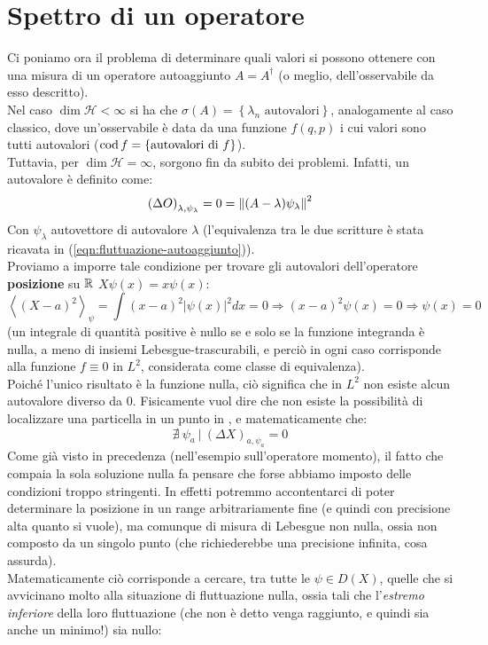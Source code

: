 \documentclass[../../FisicaTeorica.tex]{subfiles}
\begin{document}
\section{Spettro di un operatore}
Ci poniamo ora il problema di determinare quali valori si possono ottenere con una misura di un operatore autoaggiunto $A=A^\dag$ (o meglio, dell'osservabile da esso descritto).\\
Nel caso $\dim{\mathcal{H}}<\infty$ si ha che $\sigma \left(A\right)= \left\{\lambda_n\text{ autovalori}\right\}$, analogamente al caso classico, dove un'osservabile è data da una funzione $f(q,p)$ i cui valori sono tutti autovalori ($\operatorname{cod} f = \{\text{autovalori di }f\}$).\\
Tuttavia, per $\dim{\mathcal{H}}=\infty$, sorgono fin da subito dei problemi.  Infatti, un autovalore è definito come:
\[
\left(\Delta O\right)_{\lambda,\psi_\lambda}=0 = \left\lVert(A-\lambda)\psi_\lambda\right\rVert^2
\]
Con $\psi_\lambda$ autovettore di autovalore $\lambda$ 
(l'equivalenza tra le due scritture è stata ricavata in (\ref{eqn:fluttuazione-autoaggiunto})).\\
Proviamo a imporre tale condizione per trovare gli autovalori dell'operatore \textbf{posizione} su $\mathbb{R}$ $X\psi \left(x\right)=x\psi (x)$:
\[
\left\langle\left(X-a\right)^2\right\rangle_\psi=\int \left(x-a\right)^2\left|\psi\left(x\right)\right|^2dx=0\Rightarrow \left(x-a\right)^2\psi \left(x\right)=0\Rightarrow  \psi \left(x\right)=0 
\]
(un integrale di quantità positive è nullo se e solo se la funzione integranda è nulla, a meno di insiemi Lebesgue-trascurabili, e perciò in ogni caso corrisponde alla funzione $f\equiv 0$ in $L^2$, considerata come classe di equivalenza).\\
Poiché l'unico risultato è la funzione nulla, ciò significa che in $L^2$ non esiste alcun autovalore diverso da $0$. Fisicamente vuol dire che non esiste la possibilità di localizzare una particella in un punto in \MQ, e matematicamente che:
\[
\nexists\> \psi_a\>|\> \left(\Delta X\right)_{a,\psi_a}=0
\]
Come già visto in precedenza (nell'esempio sull'operatore momento), il fatto che compaia la sola soluzione nulla fa pensare che forse abbiamo imposto delle condizioni troppo stringenti. In effetti potremmo accontentarci di poter determinare la posizione in un range arbitrariamente fine (e quindi con precisione alta quanto si vuole), ma comunque di misura di Lebesgue non nulla, ossia non composto da un singolo punto (che richiederebbe una precisione infinita, cosa assurda).\\
Matematicamente ciò corrisponde a cercare, tra tutte le $\psi \in D(X)$, quelle che si avvicinano molto alla situazione di fluttuazione nulla, ossia tali che l'\textit{estremo inferiore} della loro fluttuazione (che non è detto venga raggiunto, e quindi sia anche un minimo!) sia nullo:
\end{document}
